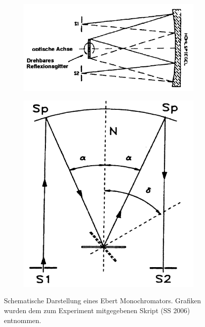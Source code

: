 \documentclass[]{article}
\begin{document}
\begin{figure}[H]
\centering
\begin{subfigure}{0.55\textwidth}
\includegraphics[width=\linewidth]{Plots/1.png}
\end{subfigure}
\begin{subfigure}[c]{0.4\linewidth}
\includegraphics[width=\linewidth]{Plots/2.png}
\end{subfigure}
\caption{Schematische Darstellung eines Ebert Monochromators. Grafiken wurden dem zum Experiment mitgegebenen Skript (SS 2006) entnommen. }
\label{fig:Monochromator}
\end{figure}
\end{document}
